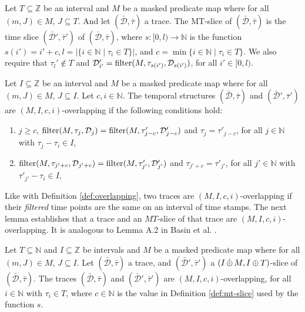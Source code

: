 \begin{definition}
    \label{def:mt-slice}
    Let $T \subseteq \mathbb{Z}$ be an interval and $M$ be a masked predicate map where for all $(m, J) \in M$, $J \subseteq T$.
    And let $(\bar{\mathcal{D}}, \bar{\tau})$ a trace.
    The MT-slice of $(\bar{\mathcal{D}}, \bar{\tau})$ is the time slice $(\bar{\mathcal{D}}', \bar{\tau}')$ of $(\bar{\mathcal{D}}, \bar{\tau})$, where $s:[0,l) \to \mathbb{N}$ is the function $s(i') = i' + c, l = |\{i \in \mathbb{N} \mid \tau_i \in T\}|$, and $c = \min\{i \in \mathbb{N} \mid \tau_i \in T \}$. 
    We also require that $\tau_l' \not\in T$ and $\mathcal{D}'_{i'} = \operatorname{filter}(M, \tau_{s(i')}, \mathcal{D}_{s(i')})$, for all $i' \in [0,l)$.
\end{definition}


\begin{definition}
    \label{def:overlapping-ext}
    Let $I \subseteq \mathbb{Z}$ be an interval and $M$ be a masked predicate map where for all $(m, J) \in M$, $J \subseteq I$.
    Let $c,i \in \mathbb{N}$.
    The temporal structures $(\bar{\mathcal{D}}, \bar{\tau})$ and $(\bar{\mathcal{D}}', \bar{\tau}')$ are $(M,I,c,i)$-overlapping if the following conditions hold:
    \renewcommand{\labelenumi}{\arabic{enumi}.}
    \begin{enumerate}
        \item $j \geq c$, $\operatorname{filter}(M, \tau_j, \mathcal{D}_j)=\operatorname{filter}(M, \tau'_{j-c}, \mathcal{D}'_{j-c})$ and $\tau_j = \tau'_{j-c}$, for all $j \in \mathbb{N}$ with $\tau_j - \tau_i \in I$,
        \item $\operatorname{filter}(M, \tau_{j' + c}, \mathcal{D}_{j' + c})=\operatorname{filter}(M, \tau'_{j'}, \mathcal{D}'_{j'})$ and $\tau_{j' + c} = \tau'_{j'}$, for all $j' \in \mathbb{N}$ with $\tau'_{j'} - \tau_i \in I$,
    \end{enumerate}
\end{definition}
Like with Definition \ref{def:overlapping}, two traces are $(M,I,c,i)$-overlapping if their \textit{filtered} time points are the same on an interval of time stamps.
The next lemma establishes that a trace and an $MT$-slice of that trace are $(M,I,c,i)$-overlapping.
It is analogous to Lemma A.2 in Basin et al. \cite{Basin2016}.
\begin{lemma}
    \label{lem:mt-slice-overlap}
    Let $T \subseteq \mathbb{N}$ and $I \subseteq \mathbb{Z}$ be intervals and $M$ be a masked predicate map where for all $(m,J) \in M$, $J \subseteq I$.
    Let $(\bar{\mathcal{D}}, \bar{\tau})$ a trace, and $(\bar{\mathcal{D}}', \bar{\tau}')$ a $(I \,\dot{\oplus}\, M, I \oplus T)$-slice of $(\bar{\mathcal{D}}, \bar{\tau})$.
    The traces $(\bar{\mathcal{D}}, \bar{\tau})$ and $(\bar{\mathcal{D}}', \bar{\tau}')$ are $(M,I,c,i)$-overlapping, for all $i \in \mathbb{N}$ with $\tau_i \in T$, where $c \in \mathbb{N}$ is the value in Definition \ref{def:mt-slice} used by the function $s$.
\end{lemma}
